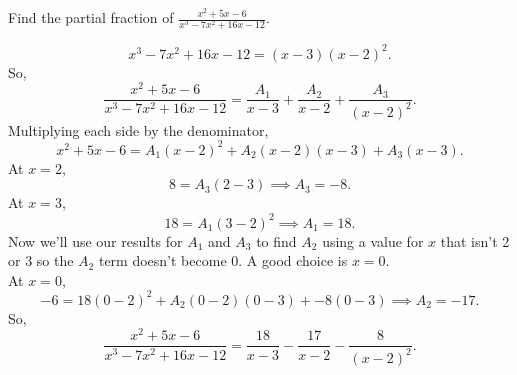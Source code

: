 \begin{example}
	Find the partial fraction of $\frac{x^2+5x-6}{x^3-7x^2+16x-12}$.
\end{example}
\begin{equation*}
	x^3-7x^2+16x-12 = (x-3)(x-2)^2.
\end{equation*}
So,
\begin{equation*}
	\frac{x^2+5x-6}{x^3-7x^2+16x-12} =  \frac{A_1}{x-3} + \frac{A_2}{x-2} + \frac{A_3}{(x-2)^2}.
\end{equation*}
Multiplying each side by the denominator,
\begin{equation*}
	x^2+5x-6 = A_1(x-2)^2 + A_2(x-2)(x-3) + A_3(x-3).
\end{equation*}
At $x=2$,
\begin{equation*}
	8 = A_3(2-3) \implies A_3 = -8.
\end{equation*}
At $x=3$,
\begin{equation*}
	18 = A_1(3-2)^2 \implies A_1 = 18.
\end{equation*}
Now we'll use our results for $A_1$ and $A_3$ to find $A_2$ using a value for $x$ that isn't 2 or 3 so the $A_2$ term doesn't become 0. A good choice is $x=0$.\\
At $x=0$,
\begin{equation*}
	-6 = 18(0-2)^2 + A_2(0-2)(0-3) + -8(0-3) \implies A_2 = -17.
\end{equation*}
So,
\begin{equation*}
	\frac{x^2+5x-6}{x^3-7x^2+16x-12} = \frac{18}{x-3} - \frac{17}{x-2} - \frac{8}{(x-2)^2}.
\end{equation*}